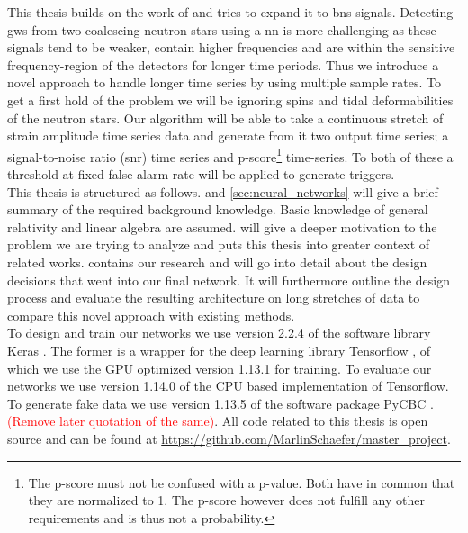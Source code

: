 This thesis builds on the work of \cite{original_deep_filtering} and tries to expand it to \gls{bns} signals. Detecting \gls{gw}s from two coalescing neutron stars using a \gls{nn} is more challenging as these signals tend to be weaker, contain higher frequencies and are within the sensitive frequency-region of the detectors for longer time periods. Thus we introduce a novel approach to handle longer time series by using multiple sample rates. To get a first hold of the problem we will be ignoring spins and tidal deformabilities of the neutron stars. Our algorithm will be able to take a continuous stretch of strain amplitude time series data and generate from it two output time series; a signal-to-noise ratio (\gls{snr}) time series and p-score\footnote{The p-score must not be confused with a p-value. Both have in common that they are normalized to 1. The p-score however does not fulfill any other requirements and is thus not a probability.} time-series. To both of these a threshold at fixed false-alarm rate will be applied to generate triggers.\medskip\\
This thesis is structured as follows.  and \autoref{sec:neural_networks} will give a brief summary of the required background knowledge. Basic knowledge of general relativity and linear algebra are assumed.  will give a deeper motivation to the problem we are trying to analyze and puts this thesis into greater context of related works.  contains our research and will go into detail about the design decisions that went into our final network. It will furthermore outline the design process and evaluate the resulting architecture on long stretches of data to compare this novel approach with existing methods.\medskip\\
To design and train our networks we use version 2.2.4 of the software library Keras \cite{keras}. The former is a wrapper for the deep learning library Tensorflow \cite{tensorflow}, of which we use the GPU optimized version 1.13.1 for training. To evaluate our networks we use version 1.14.0 of the CPU based implementation of Tensorflow. To generate fake data we use version 1.13.5 of the software package PyCBC \cite{pycbc}. \textcolor{red}{(Remove later quotation of the same)}. All code related to this thesis is open source and can be found at \url{https://github.com/MarlinSchaefer/master_project}.
